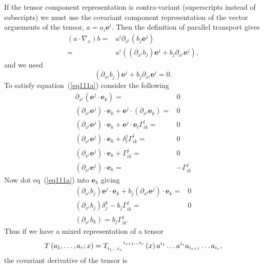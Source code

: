 \documentclass[12pt,twoside,openright]{memoir}
\newcommand{\bm}[1]{\boldsymbol{#1}}
\newcommand{\lp}{\left (}
\newcommand{\rp}{\right )}
\newcommand{\f}[2]{{#1}\lp {#2} \rp}
\newcommand{\paren}[1]{\lp {#1} \rp}
\newcommand{\be}{\begin{equation}}
\newcommand{\ee}{\end{equation}}
\newcommand{\eb}{\bm{e}}
\begin{document}
If the tensor component representation is contra-variant (superscripts instead of subscripts) we must use the covariant component representation of
the vector arguements of the tensor, $a = a_{i}\eb^{i}$.  Then the definition of parallel transport gives
\begin{align}
	\paren{a\cdot\nabla_{x}}b =& a^{i}\partial_{x^{i}}\paren{b_{j}\eb^{j}} \nonumber \\
	                          =& a^{i}\paren{\paren{\partial_{x^{i}}b_{j}}\eb^{j} + b_{j}\partial_{x^{i}}\eb^{j}},
\end{align}
and we need
\be
	\paren{\partial_{x^{i}}b_{j}}\eb^{j} + b_{j}\partial_{x^{i}}\eb^{j} = 0. \label{eq111a}
\ee
To satisfy equation~(\ref{eq111a}) consider the following
\begin{align}
	\partial_{x^{i}}\paren{\eb^{j}\cdot\eb_{k}} =& 0 \nonumber \\
	\paren{\partial_{x^{i}}\eb^{j}}\cdot\eb_{k} + \eb^{j}\cdot\paren{\partial_{x^{i}}\eb_{k}} =& 0  \nonumber \\
	\paren{\partial_{x^{i}}\eb^{j}}\cdot\eb_{k} + \eb^{j}\cdot\eb_{l}\Gamma_{ik}^{l} =& 0 \nonumber \\
	\paren{\partial_{x^{i}}\eb^{j}}\cdot\eb_{k} + \delta_{l}^{j}\Gamma_{ik}^{l} =& 0 \nonumber \\
	\paren{\partial_{x^{i}}\eb^{j}}\cdot\eb_{k} + \Gamma_{ik}^{j} =& 0 \nonumber \\
	\paren{\partial_{x^{i}}\eb^{j}}\cdot\eb_{k} =& -\Gamma_{ik}^{j}
\end{align}
Now dot eq~(\ref{eq111a}) into $\eb_{k}$ giving
\begin{align}
	\paren{\partial_{x^{i}}b_{j}}\eb^{j}\cdot\eb_{k} + b_{j}\paren{\partial_{x^{i}}\eb^{j}}\cdot\eb_{k} =& 0  \nonumber \\
	\paren{\partial_{x^{i}}b_{j}}\delta_{j}^{k} - b_{j}\Gamma_{ik}^{j} =& 0 \nonumber \\
	\paren{\partial_{x^{i}}b_{k}} = b_{j}\Gamma_{ik}^{j}.
\end{align}
Thus if we have a mixed representation of a tensor 
\be
\f{T}{a_{1},\dots,a_{r};x} = 
	\f{T\indices{_{i_{1}\dots i_{s}}^{i_{s+1}\dots i_{r}}}}{x}a^{i_{1}}\dots a^{i_{s}}a_{i_{s+1}}\dots a_{i_{r}},
\ee
the covariant derivative of the tensor is
\end{document}
